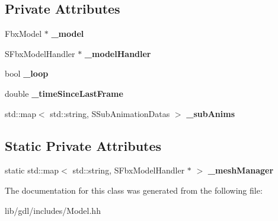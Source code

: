 \subsection*{Private Attributes}
\begin{DoxyCompactItemize}
\item 
\hypertarget{classgdl_1_1_model_a77abc5e28c6bb239efe898c63312fa2f}{}Fbx\+Model $\ast$ {\bfseries \+\_\+model}\label{classgdl_1_1_model_a77abc5e28c6bb239efe898c63312fa2f}

\item 
\hypertarget{classgdl_1_1_model_a93a620a2af97597fb545f86dd236063a}{}S\+Fbx\+Model\+Handler $\ast$ {\bfseries \+\_\+model\+Handler}\label{classgdl_1_1_model_a93a620a2af97597fb545f86dd236063a}

\item 
\hypertarget{classgdl_1_1_model_a5c801dcd2b17b692c9762f5a76a53e65}{}bool {\bfseries \+\_\+loop}\label{classgdl_1_1_model_a5c801dcd2b17b692c9762f5a76a53e65}

\item 
\hypertarget{classgdl_1_1_model_a6513f5a017d5a0a542372522b2f1781b}{}double {\bfseries \+\_\+time\+Since\+Last\+Frame}\label{classgdl_1_1_model_a6513f5a017d5a0a542372522b2f1781b}

\item 
\hypertarget{classgdl_1_1_model_aa97070e9962ec6b5f86d55ab642b7025}{}std\+::map$<$ std\+::string, S\+Sub\+Animation\+Datas $>$ {\bfseries \+\_\+sub\+Anims}\label{classgdl_1_1_model_aa97070e9962ec6b5f86d55ab642b7025}

\end{DoxyCompactItemize}
\subsection*{Static Private Attributes}
\begin{DoxyCompactItemize}
\item 
\hypertarget{classgdl_1_1_model_adbb05700333f09f60d288734fe9a6eaa}{}static std\+::map$<$ std\+::string, S\+Fbx\+Model\+Handler $\ast$ $>$ {\bfseries \+\_\+mesh\+Manager}\label{classgdl_1_1_model_adbb05700333f09f60d288734fe9a6eaa}

\end{DoxyCompactItemize}


The documentation for this class was generated from the following file\+:\begin{DoxyCompactItemize}
\item 
lib/gdl/includes/Model.\+hh\end{DoxyCompactItemize}
